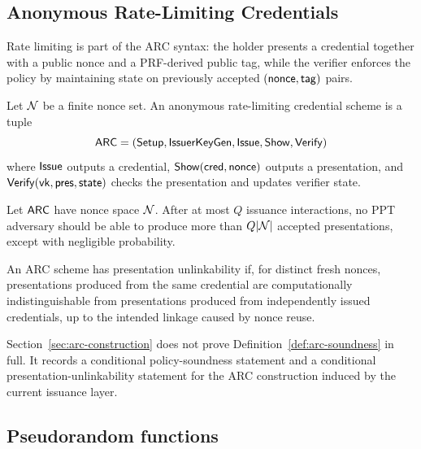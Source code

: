 \subsection{Anonymous Rate-Limiting Credentials}
\label{subsec:arc-security}
Rate limiting is part of the ARC syntax: the holder presents a credential together with a public nonce and a
PRF-derived public tag, while the verifier enforces the policy by maintaining state on previously accepted
$(\mathsf{nonce},\mathsf{tag})$ pairs.

\begin{definition}\label{def:arc-syntax}
Let $\mathcal{N}$ be a finite nonce set.  An anonymous rate-limiting credential scheme is a tuple
\[
  \mathsf{ARC}=(\mathsf{Setup},\mathsf{IssuerKeyGen},\mathsf{Issue},\mathsf{Show},\mathsf{Verify})
\]
where $\mathsf{Issue}$ outputs a credential, $\mathsf{Show}(\mathsf{cred},\mathsf{nonce})$ outputs a presentation, and
$\mathsf{Verify}(\mathsf{vk},\mathsf{pres},\mathsf{state})$ checks the presentation and updates verifier state.
\end{definition}

\begin{definition}\label{def:arc-soundness}
Let $\mathsf{ARC}$ have nonce space $\mathcal{N}$.  After at most $Q$ issuance interactions, no PPT adversary should
be able to produce more than $Q|\mathcal{N}|$ accepted presentations, except with negligible probability.
\end{definition}

\begin{definition}\label{def:pres-unlink}
An ARC scheme has presentation unlinkability if, for distinct fresh nonces, presentations produced from the
same credential are computationally indistinguishable from presentations produced from independently issued
credentials, up to the intended linkage caused by nonce reuse.
\end{definition}

\begin{remark}\label{rem:arc-scope}
Section~\ref{sec:arc-construction} does not prove Definition~\ref{def:arc-soundness} in full.  It records a
conditional policy-soundness statement and a conditional presentation-unlinkability statement for the ARC
construction induced by the current issuance layer.
\end{remark}

\subsection{Pseudorandom functions}
\label{subsec:prelim-prf}
\label{subsec:prf}

